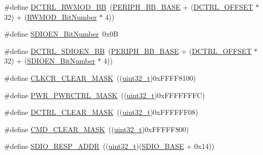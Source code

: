 \begin{DoxyCompactItemize}
\item 
\#define \hyperlink{group___s_d_i_o___private___types_definitions_gad34bfe8650534ce24320ae83886c91e3}{D\+C\+T\+R\+L\+\_\+\+R\+W\+M\+O\+D\+\_\+\+BB}~(\hyperlink{openmotestm_2library_2inc_2stm32f10x__map_8h_aed7efc100877000845c236ccdc9e144a}{P\+E\+R\+I\+P\+H\+\_\+\+B\+B\+\_\+\+B\+A\+SE} + (\hyperlink{openmotestm_2library_2src_2stm32f10x__sdio_8c_a948c1382c4cfd3af3e406c4d0cdd4240}{D\+C\+T\+R\+L\+\_\+\+O\+F\+F\+S\+ET} $\ast$ 32) + (\hyperlink{openmotestm_2library_2src_2stm32f10x__sdio_8c_ad7b722671f65e79d1be2899b643278ad}{R\+W\+M\+O\+D\+\_\+\+Bit\+Number} $\ast$ 4))
\item 
\#define \hyperlink{group___s_d_i_o___private___types_definitions_ga37f3e1612e0dae8160be978ebfa54301}{S\+D\+I\+O\+E\+N\+\_\+\+Bit\+Number}~0x0B
\item 
\#define \hyperlink{group___s_d_i_o___private___types_definitions_ga894f7da62b89ddd9f4b79d066056a3c7}{D\+C\+T\+R\+L\+\_\+\+S\+D\+I\+O\+E\+N\+\_\+\+BB}~(\hyperlink{openmotestm_2library_2inc_2stm32f10x__map_8h_aed7efc100877000845c236ccdc9e144a}{P\+E\+R\+I\+P\+H\+\_\+\+B\+B\+\_\+\+B\+A\+SE} + (\hyperlink{openmotestm_2library_2src_2stm32f10x__sdio_8c_a948c1382c4cfd3af3e406c4d0cdd4240}{D\+C\+T\+R\+L\+\_\+\+O\+F\+F\+S\+ET} $\ast$ 32) + (\hyperlink{openmotestm_2library_2src_2stm32f10x__sdio_8c_a37f3e1612e0dae8160be978ebfa54301}{S\+D\+I\+O\+E\+N\+\_\+\+Bit\+Number} $\ast$ 4))
\item 
\#define \hyperlink{group___s_d_i_o___private___types_definitions_gac8d10dd1e49ca9e8a6954146654e9a01}{C\+L\+K\+C\+R\+\_\+\+C\+L\+E\+A\+R\+\_\+\+M\+A\+SK}~((\hyperlink{_p_e___types_8h_a33594304e786b158f3fb30289278f5af}{uint32\+\_\+t})0x\+F\+F\+F\+F8100)
\item 
\#define \hyperlink{group___s_d_i_o___private___types_definitions_ga7e6ec7be68d0fbb8fb4e3725cca9a05c}{P\+W\+R\+\_\+\+P\+W\+R\+C\+T\+R\+L\+\_\+\+M\+A\+SK}~((\hyperlink{_p_e___types_8h_a33594304e786b158f3fb30289278f5af}{uint32\+\_\+t})0x\+F\+F\+F\+F\+F\+F\+F\+C)
\item 
\#define \hyperlink{group___s_d_i_o___private___types_definitions_ga9e9fc7810b95805aeeb760bbdd87fa9b}{D\+C\+T\+R\+L\+\_\+\+C\+L\+E\+A\+R\+\_\+\+M\+A\+SK}~((\hyperlink{_p_e___types_8h_a33594304e786b158f3fb30289278f5af}{uint32\+\_\+t})0x\+F\+F\+F\+F\+F\+F08)
\item 
\#define \hyperlink{group___s_d_i_o___private___types_definitions_ga2325d77090e44221b07f8fba5bc9217e}{C\+M\+D\+\_\+\+C\+L\+E\+A\+R\+\_\+\+M\+A\+SK}~((\hyperlink{_p_e___types_8h_a33594304e786b158f3fb30289278f5af}{uint32\+\_\+t})0x\+F\+F\+F\+F\+F800)
\item 
\#define \hyperlink{group___s_d_i_o___private___types_definitions_ga4285ce49b005e3d03ddf9fdc491c4d70}{S\+D\+I\+O\+\_\+\+R\+E\+S\+P\+\_\+\+A\+D\+DR}~((\hyperlink{_p_e___types_8h_a33594304e786b158f3fb30289278f5af}{uint32\+\_\+t})(\hyperlink{openmotestm_2library_2inc_2stm32f10x__map_8h_a95dd0abbc6767893b4b02935fa846f52}{S\+D\+I\+O\+\_\+\+B\+A\+SE} + 0x14))
\end{DoxyCompactItemize}

